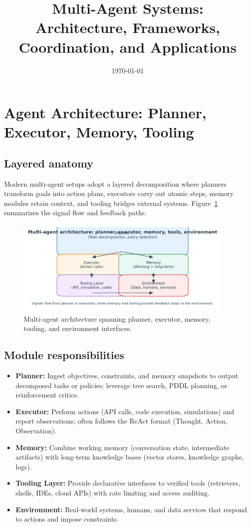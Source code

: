 \documentclass{article}
\title{Multi-Agent Systems: Architecture, Frameworks, Coordination, and Applications}
\author{}
\date{\today}
\begin{document}
\maketitle

\section{Agent Architecture: Planner, Executor, Memory, Tooling}
\subsection{Layered anatomy}
Modern multi-agent setups adopt a layered decomposition where planners transform goals into action plans, executors carry out atomic steps, memory modules retain context, and tooling bridges external systems. Figure~\ref{fig:multi_agent_architecture_en} summarizes the signal flow and feedback paths.
\begin{figure}[H]
  \centering
  \includegraphics[width=0.95\textwidth]{multi_agent_architecture.png}
  \caption{Multi-agent architecture spanning planner, executor, memory, tooling, and environment interfaces.}
  \label{fig:multi_agent_architecture_en}
\end{figure}

\subsection{Module responsibilities}
\begin{itemize}
  \item \textbf{Planner:} Ingest objectives, constraints, and memory snapshots to output decomposed tasks or policies; leverage tree search, PDDL planning, or reinforcement critics.
  \item \textbf{Executor:} Perform actions (API calls, code execution, simulations) and report observations; often follows the ReAct format (Thought, Action, Observation).
  \item \textbf{Memory:} Combine working memory (conversation state, intermediate artifacts) with long-term knowledge bases (vector stores, knowledge graphs, logs).
  \item \textbf{Tooling Layer:} Provide declarative interfaces to verified tools (retrievers, shells, IDEs, cloud APIs) with rate limiting and access auditing.
  \item \textbf{Environment:} Real-world systems, humans, and data services that respond to actions and impose constraints.
\end{itemize}
\end{document}
